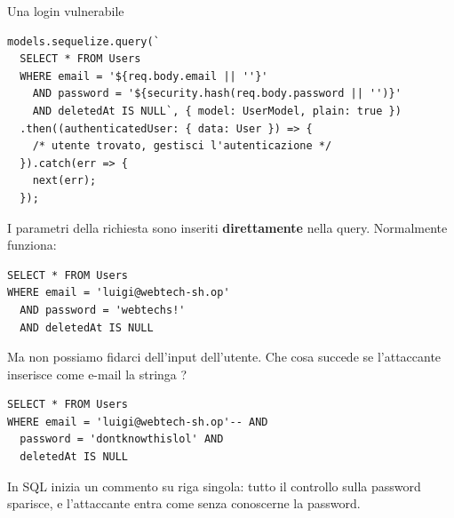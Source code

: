 \begin{esempio}{Una login vulnerabile}
\begin{lstlisting}[style=ts, name=login-vulnerabile.ts]
models.sequelize.query(`
  SELECT * FROM Users
  WHERE email = '${req.body.email || ''}'
    AND password = '${security.hash(req.body.password || '')}'
    AND deletedAt IS NULL`, { model: UserModel, plain: true })
  .then((authenticatedUser: { data: User }) => {
    /* utente trovato, gestisci l'autenticazione */
  }).catch(err => {
    next(err);
  });
\end{lstlisting}

I parametri della richiesta sono inseriti \textbf{direttamente} nella query.
Normalmente funziona:

\begin{lstlisting}[style=sql]
SELECT * FROM Users
WHERE email = 'luigi@webtech-sh.op'
  AND password = 'webtechs!'
  AND deletedAt IS NULL
\end{lstlisting}

Ma non possiamo fidarci dell'input dell'utente. Che cosa succede se
l'attaccante inserisce come e-mail la stringa
?

\begin{affianco}[0.46][c]
\begin{lstlisting}[style=sql]
SELECT * FROM Users
WHERE email = 'luigi@webtech-sh.op'-- AND
  password = 'dontknowthislol' AND
  deletedAt IS NULL
\end{lstlisting}
\risultato
\begin{immagine}
\end{immagine}
\end{affianco}

In SQL \code{-{}-} inizia un commento su riga singola: tutto il controllo sulla
password sparisce, e l'attaccante entra come  senza conoscerne la
password.
\end{esempio}

